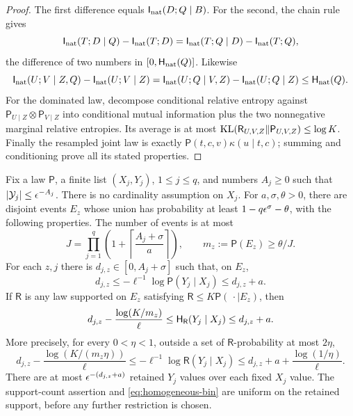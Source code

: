 \begin{proof}
The first difference equals $\mathsf I_{\mathrm{nat}}(D;Q\mid B)$.
For the second, the chain rule gives
\[
 \mathsf I_{\mathrm{nat}}(T;D\mid Q)-\mathsf I_{\mathrm{nat}}(T;D)
 =\mathsf I_{\mathrm{nat}}(T;Q\mid D)-\mathsf I_{\mathrm{nat}}(T;Q),
\]
the difference of two numbers in $[0,\mathsf H_{\mathrm{nat}}(Q)]$.
Likewise
\[
 \mathsf I_{\mathrm{nat}}(U;V\mid Z,Q)-\mathsf I_{\mathrm{nat}}(U;V\mid Z)
 =\mathsf I_{\mathrm{nat}}(U;Q\mid V,Z)-\mathsf I_{\mathrm{nat}}(U;Q\mid Z)
 \le\mathsf H_{\mathrm{nat}}(Q).
\]
For the dominated law, decompose conditional relative entropy against
$\mathsf P_{U\mid Z}\otimes\mathsf P_{V\mid Z}$ into conditional
mutual information plus the two nonnegative marginal relative
entropies.  Its average is at most
$\operatorname{KL}(\mathsf R_{U,V,Z}\Vert\mathsf P_{U,V,Z})\le\log K$.
Finally the resampled joint law is exactly
$\mathsf P(t,c,v)\kappa(u\mid t,c)$; summing and conditioning prove
all its stated properties.
\end{proof}

\begin{lemma}
\label{lem:homogenization}
Fix a law $\mathsf P$, a finite list $(X_j,Y_j)$, $1\le j\le q$,
and numbers $A_j\ge0$ such that $|\mathcal Y_j|\le\epsilon^{-A_j}$.
There is no cardinality assumption on $X_j$.
For $a,\sigma,\theta>0$, there are disjoint events $E_z$ whose union
has probability at least $1-q\epsilon^\sigma-\theta$, with the following
properties.  The number of events is at most
\[
 J=\prod_{j=1}^q\left(1+\left\lceil\frac{A_j+\sigma}{a}\right\rceil\right),
 \qquad m_z:=\mathsf P(E_z)\ge\theta/J.
\]
For each $z,j$ there is $d_{j,z}\in[0,A_j+\sigma]$ such that, on $E_z$,
\begin{equation}
 d_{j,z}\le -\ell^{-1}\log\mathsf P(Y_j\mid X_j)
 \le d_{j,z}+a.
 \label{eq:homogeneous-bin}
\end{equation}
If $\mathsf R$ is any law supported on $E_z$ satisfying
$\mathsf R\le K\mathsf P(\,\cdot\mid E_z)$, then
\begin{equation}
 d_{j,z}-\frac{\log(K/m_z)}\ell
 \le\mathsf H_{\mathsf R}(Y_j\mid X_j)\le d_{j,z}+a.
 \label{eq:homogeneous-entropy}
\end{equation}
More precisely, for every $0<\eta<1$, outside a set of
$\mathsf R$-probability at most $2\eta$,
\begin{equation}
 d_{j,z}-\frac{\log(K/(m_z\eta))}\ell
 \le-\ell^{-1}\log\mathsf R(Y_j\mid X_j)
 \le d_{j,z}+a+\frac{\log(1/\eta)}\ell.
 \label{eq:homogeneous-surprise}
\end{equation}
There are at most $\epsilon^{-(d_{j,z}+a)}$ retained $Y_j$ values over
each fixed $X_j$ value.  The support-count assertion and
\eqref{eq:homogeneous-bin} are uniform on the retained support,
before any further restriction is chosen.
\end{lemma}

